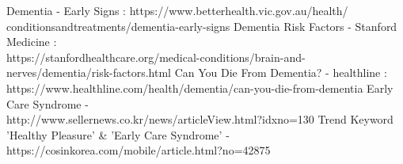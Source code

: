 \documentclass[conference]{IEEEtran}
\begin{document}
\begin{thebibliography}{00}
 Dementia - Early Signs : https://www.betterhealth.vic.gov.au/health/\\conditionsandtreatments/dementia-early-signs
 Dementia Risk Factors - Stanford Medicine :\\https://stanfordhealthcare.org/medical-conditions/brain-and-nerves/dementia/risk-factors.html
 Can You Die From Dementia? - healthline :\\ https://www.healthline.com/health/dementia/can-you-die-from-dementia
 Early Care Syndrome - \\http://www.sellernews.co.kr/news/articleView.html?idxno=130
 Trend Keyword 'Healthy Pleasure' \& 'Early Care Syndrome' - https://cosinkorea.com/mobile/article.html?no=42875
\end{thebibliography}

\tableofcontents

\listoffigures

\listoftables
\end{document}
